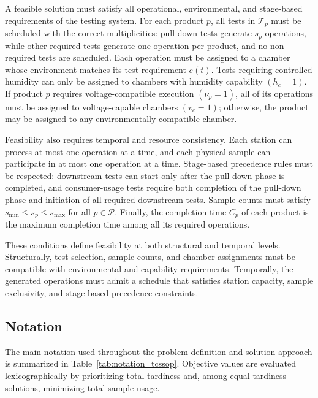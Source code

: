 \documentclass[11pt]{article}
\begin{document}
A feasible solution must satisfy all operational, environmental, and stage-based requirements of the testing system. For each product \(p\), all tests in \(\mathcal{T}_p\) must be scheduled with the correct multiplicities: pull-down tests generate \(s_p\) operations, while other required tests generate one operation per product, and no non-required tests are scheduled. Each operation must be assigned to a chamber whose environment matches its test requirement \(e(t)\). Tests requiring controlled humidity can only be assigned to chambers with humidity capability \((h_c=1)\). If product \(p\) requires voltage-compatible execution \((\nu_p=1)\), all of its operations must be assigned to voltage-capable chambers \((v_c=1)\); otherwise, the product may be assigned to any environmentally compatible chamber.

Feasibility also requires temporal and resource consistency. Each station can process at most one operation at a time, and each physical sample can participate in at most one operation at a time. Stage-based precedence rules must be respected: downstream tests can start only after the pull-down phase is completed, and consumer-usage tests require both completion of the pull-down phase and initiation of all required downstream tests. Sample counts must satisfy \(s_{\min}\le s_p\le s_{\max}\) for all \(p\in\mathcal{P}\). Finally, the completion time \(C_p\) of each product is the maximum completion time among all its required operations.

These conditions define feasibility at both structural and temporal levels. Structurally, test selection, sample counts, and chamber assignments must be compatible with environmental and capability requirements. Temporally, the generated operations must admit a schedule that satisfies station capacity, sample exclusivity, and stage-based precedence constraints.

\subsection{Notation}
\label{subsec:notation}

The main notation used throughout the problem definition and solution approach is summarized in Table~\ref{tab:notation_tcssop}. Objective values are evaluated lexicographically by prioritizing total tardiness and, among equal-tardiness solutions, minimizing total sample usage.
\end{document}

